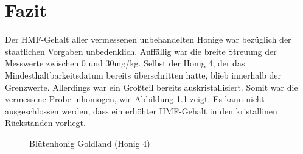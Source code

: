 \chapter{Fazit}
Der HMF-Gehalt aller vermessenen unbehandelten Honige war bezüglich der staatlichen Vorgaben unbedenklich. Auffällig war die breite Streuung der Messwerte zwischen 0 und 30mg/kg. Selbst der Honig 4, der das Mindesthaltbarkeitsdatum bereits überschritten hatte, blieb innerhalb der Grenzwerte. Allerdings war ein Großteil bereits auskristallisiert. Somit war die vermessene Probe inhomogen, wie Abbildung \ref{fig:Blütenhonig} zeigt. Es kann nicht ausgeschlossen werden, dass ein erhöhter HMF-Gehalt in den kristallinen Rückständen vorliegt.
    \begin{figure}[htbp]
    \centering
    \caption{Blütenhonig Goldland (Honig 4)}
    \label{fig:Blütenhonig}
    \end{figure}

